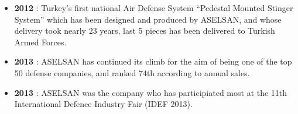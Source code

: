 \begin{itemize}
\item \textbf{  2012 } : Turkey’s first national Air Defense System “Pedestal Mounted Stinger System” which has been designed and produced by ASELSAN, and whose delivery took nearly 23 years, last 5 pieces has been delivered to Turkish Armed Forces.
\item \textbf{ 2013 } : ASELSAN has continued its climb for the aim of being one of the top 50 defense companies, and ranked 74th according to annual sales.
\item \textbf{ 2013 } : ASELSAN was the company who has participiated most at the 11th International Defence Industry Fair (IDEF 2013).	

\end{itemize}

